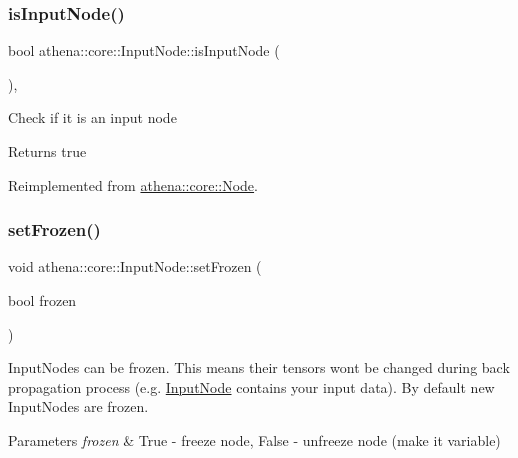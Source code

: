 \subsubsection{\texorpdfstring{is\+Input\+Node()}{isInputNode()}}
{\footnotesize\ttfamily bool athena\+::core\+::\+Input\+Node\+::is\+Input\+Node (\begin{DoxyParamCaption}{ }\end{DoxyParamCaption})\hspace{0.3cm}{\ttfamily [override]}, {\ttfamily [virtual]}}

Check if it is an input node \begin{DoxyReturn}{Returns}
true 
\end{DoxyReturn}


Reimplemented from \mbox{\hyperlink{classathena_1_1core_1_1_node_a6ae012557fc6b29127366b1e92801d4a}{athena\+::core\+::\+Node}}.

\mbox{\label{classathena_1_1core_1_1_input_node_a45311e1bbff5dd28df3c3877aaa10109}} 
\subsubsection{\texorpdfstring{set\+Frozen()}{setFrozen()}}
{\footnotesize\ttfamily void athena\+::core\+::\+Input\+Node\+::set\+Frozen (\begin{DoxyParamCaption}\item[{bool}]{frozen }\end{DoxyParamCaption})}

Input\+Nodes can be frozen. This means their tensors won\textquotesingle{}t be changed during back propagation process (e.\+g. \mbox{\hyperlink{classathena_1_1core_1_1_input_node}{Input\+Node}} contains your input data). By default new Input\+Nodes are frozen. 
\begin{DoxyParams}{Parameters}
{\em frozen} & True -\/ freeze node, False -\/ unfreeze node (make it variable) \\
\hline
\end{DoxyParams}
\mbox{\label{classathena_1_1core_1_1_input_node_a8c17ce96d989454e6316c1c049c2c98d}} 

